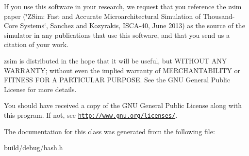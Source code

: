 If you use this software in your research, we request that you reference the zsim paper (\char`\"{}\-Z\-Sim\-: Fast and Accurate Microarchitectural Simulation of
\-Thousand-\/\-Core Systems\char`\"{}, Sanchez and Kozyrakis, I\-S\-C\-A-\/40, June 2013) as the source of the simulator in any publications that use this software, and that you send us a citation of your work.

zsim is distributed in the hope that it will be useful, but W\-I\-T\-H\-O\-U\-T A\-N\-Y W\-A\-R\-R\-A\-N\-T\-Y; without even the implied warranty of M\-E\-R\-C\-H\-A\-N\-T\-A\-B\-I\-L\-I\-T\-Y or F\-I\-T\-N\-E\-S\-S F\-O\-R A P\-A\-R\-T\-I\-C\-U\-L\-A\-R P\-U\-R\-P\-O\-S\-E. See the G\-N\-U General Public License for more details.

You should have received a copy of the G\-N\-U General Public License along with this program. If not, see \href{http://www.gnu.org/licenses/}{\tt http\-://www.\-gnu.\-org/licenses/}. 

The documentation for this class was generated from the following file\-:\begin{DoxyCompactItemize}
\item 
build/debug/hash.\-h\end{DoxyCompactItemize}
